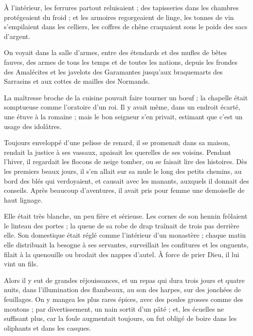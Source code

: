 \documentclass[]{book}
\begin{document}
                À l'intérieur, les ferrures partout reluisaient ; des tapisseries dans les chambres protégeaient du froid ; et les armoires regorgeaient de linge, les tonnes de vin s'empilaient dans les celliers, les coffres de chêne craquaient sous le poids des sacs d'argent.
                    
                On voyait dans la salle d'armes, entre des étendards et des mufles de bêtes fauves, des armes de tous les temps et de toutes les nations, depuis les frondes des Amalécites et les javelots des Garamantes jusqu'aux braquemarts des Sarrasins et aux cottes de mailles des Normands.
                    
                La maîtresse broche de la cuisine pouvait faire tourner un bœuf ; la chapelle était somptueuse comme l'oratoire d'un roi. Il y avait même, dans un endroit écarté, une étuve à la romaine ; mais le bon seigneur s'en privait, estimant que c'est un usage des idolâtres.
                    
                Toujours enveloppé d'une pelisse de renard, il se promenait dans sa maison, rendait la justice à ses vassaux, apaisait les querelles de ses voisins. Pendant l'hiver, il regardait les flocons de neige tomber, ou se faisait lire des histoires. Dès les premiers beaux jours, il s'en allait sur sa mule le long des petits chemins, au bord des blés qui verdoyaient, et causait avec les manants, auxquels il donnait des conseils. Après beaucoup d'aventures, il avait pris pour femme une demoiselle de haut lignage.
                    
                Elle était très blanche, un peu fière et sérieuse. Les cornes de son hennin frôlaient le linteau des portes ; la queue de sa robe de drap traînait de trois pas derrière elle. Son domestique était réglé comme l'intérieur d'un monastère ; chaque matin elle distribuait la besogne à ses servantes, surveillait les confitures et les onguents, filait à la quenouille ou brodait des nappes d'autel. À force de prier Dieu, il lui vint un fils.
                    
                Alors il y eut de grandes réjouissances, et un repas qui dura trois jours et quatre nuits, dans l'illumination des flambeaux, au son des harpes, sur des jonchées de feuillages. On y mangea les plus rares épices, avec des poules grosses comme des moutons ; par divertissement, un nain sortit d'un pâté ; et, les écuelles ne suffisant plus, car la foule augmentait toujours, on fut obligé de boire dans les oliphants et dans les casques.
                    
\end{document}
